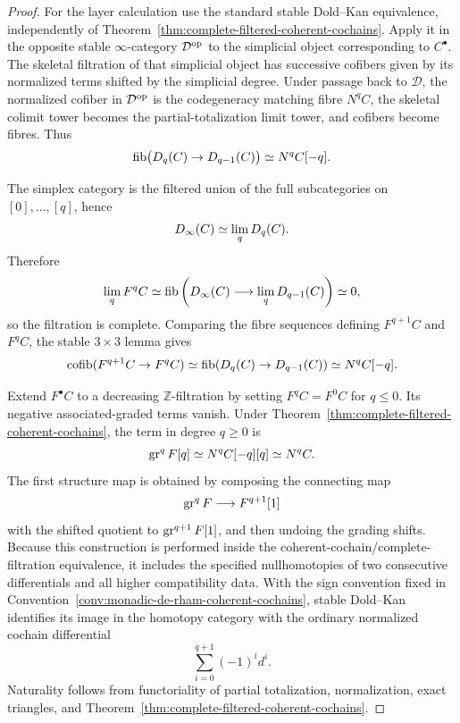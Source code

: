 \begin{proof}
For the layer calculation use the standard stable Dold--Kan equivalence, independently of
Theorem~\ref{thm:complete-filtered-coherent-cochains}.  Apply it in the opposite stable
\(\infty\)-category \(\mathcal D^{\mathrm{op}}\) to the simplicial object corresponding to
\(C^\bullet\).  The skeletal filtration of that simplicial object has successive cofibers given by
its normalized terms shifted by the simplicial degree.  Under passage back to \(\mathcal D\), the
normalized cofiber in \(\mathcal D^{\mathrm{op}}\) is the codegeneracy matching fibre \(N^qC\), the
skeletal colimit tower becomes the partial-totalization limit tower, and cofibers become fibres.
Thus
\[
    \operatorname{fib}\bigl(D_q(C)\to D_{q-1}(C)\bigr)
    \simeq
    N^qC[-q].
\]

The simplex category is the filtered union of the full subcategories on
\([0],\ldots,[q]\), hence
\[
    D_\infty(C)
    \simeq
    \operatorname*{lim}_qD_q(C).
\]
Therefore
\[
    \operatorname*{lim}_qF^qC
    \simeq
    \operatorname{fib}
    \left(
        D_\infty(C)\longrightarrow\operatorname*{lim}_qD_{q-1}(C)
    \right)
    \simeq0,
\]
so the filtration is complete.  Comparing the fibre sequences defining \(F^{q+1}C\) and
\(F^qC\), the stable \(3\times3\) lemma gives
\[
    \operatorname{cofib}(F^{q+1}C\to F^qC)
    \simeq
    \operatorname{fib}(D_q(C)\to D_{q-1}(C))
    \simeq
    N^qC[-q].
\]

Extend \(F^\bullet C\) to a decreasing \(\mathbb Z\)-filtration by setting
\(F^qC=F^0C\) for \(q\leq0\).  Its negative associated-graded terms vanish.  Under Theorem~\ref{thm:complete-filtered-coherent-cochains}, the term in degree
\(q\geq0\) is
\[
    \operatorname{gr}^qF[q]
    \simeq
    N^qC[-q][q]
    \simeq
    N^qC.
\]
The first structure map is obtained by composing the connecting map
\[
    \operatorname{gr}^qF\longrightarrow F^{q+1}[1]
\]
with the shifted quotient to \(\operatorname{gr}^{q+1}F[1]\), and then undoing the grading shifts.  Because this
construction is performed inside the coherent-cochain/complete-filtration equivalence, it includes
the specified nullhomotopies of two consecutive differentials and all higher compatibility data.
With the sign convention fixed in Convention~\ref{conv:monadic-de-rham-coherent-cochains}, stable
Dold--Kan identifies its image in the homotopy category with the ordinary normalized cochain
differential
\[
    \sum_{i=0}^{q+1}(-1)^id^i.
\]
Naturality follows from functoriality of partial totalization, normalization, exact triangles, and
Theorem~\ref{thm:complete-filtered-coherent-cochains}.
\end{proof}

